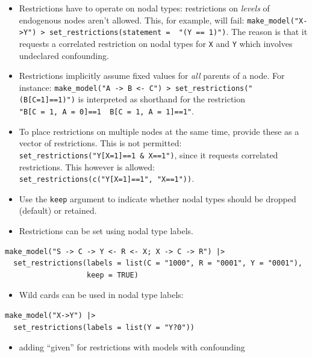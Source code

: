 \documentclass[
  article]{jss}
\providecommand{\tightlist}{%
  \setlength{\itemsep}{0pt}\setlength{\parskip}{0pt}}\usepackage{longtable,booktabs,array}
\begin{document}
\begin{itemize}
\tightlist
\item
  Restrictions have to operate on nodal types: restrictions on
  \emph{levels} of endogenous nodes aren't allowed. This, for example,
  will fail:
  \texttt{make\_model("X-\textgreater{}Y")\ \textbar{}\textgreater{}\ set\_restrictions(statement\ =\ \ "(Y\ ==\ 1)")}.
  The reason is that it requests a correlated restriction on nodal types
  for \texttt{X} and \texttt{Y} which involves undeclared confounding.
\item
  Restrictions implicitly assume fixed values for \emph{all} parents of
  a node. For instance:
  \texttt{make\_model("A\ -\textgreater{}\ B\ \textless{}-\ C")\ \textbar{}\textgreater{}\ set\_restrictions("(B{[}C=1{]}==1)")}
  is interpreted as shorthand for the restriction
  \texttt{"B{[}C\ =\ 1,\ A\ =\ 0{]}==1\ \textbar{}\ B{[}C\ =\ 1,\ A\ =\ 1{]}==1"}.
\item
  To place restrictions on multiple nodes at the same time, provide
  these as a vector of restrictions. This is not permitted:
  \texttt{set\_restrictions("Y{[}X=1{]}==1\ \&\ X==1")}, since it
  requests correlated restrictions. This however is allowed:
  \texttt{set\_restrictions(c("Y{[}X=1{]}==1",\ "X==1"))}.\\
\item
  Use the \texttt{keep} argument to indicate whether nodal types should
  be dropped (default) or retained.
\item
  Restrictions can be set using nodal type labels.
\end{itemize}

\begin{verbatim}
make_model("S -> C -> Y <- R <- X; X -> C -> R") |>
  set_restrictions(labels = list(C = "1000", R = "0001", Y = "0001"), 
                   keep = TRUE)
\end{verbatim}

\begin{itemize}
\tightlist
\item
  Wild cards can be used in nodal type labels:
\end{itemize}

\begin{verbatim}
make_model("X->Y") |>
  set_restrictions(labels = list(Y = "Y?0"))
\end{verbatim}

\begin{itemize}
\tightlist
\item
  adding ``given'' for restrictions with models with confounding
\end{itemize}
\end{document}
